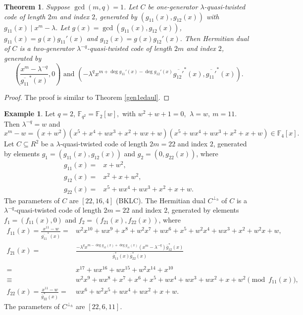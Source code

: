 \documentclass[12 pt]{extarticle}
\numberwithin{equation}{section}
\newtheorem{theorem}{Theorem}[section]
\theoremstyle{definition}
\newtheorem{example}{Example}[section]
\begin{document}
    \begin{theorem}\label{gen1hdaul}
Suppose $\gcd(m,q)=1$. Let $C$ be one-generator $\lambda$-quasi-twisted code of length $2m$ and index $2$, generated by $(g_{11}(x),g_{12}(x))$ with $g_{11}(x)\mid x^m-\lambda$. Let $g(x)=\gcd(g_{11}(x),g_{12}(x))$, $g_{11}(x)=g(x)g_{11}'(x)$ and $g_{12}(x)=g(x)g_{12}'(x)$. Then Hermitian dual of $C$ is a two-generator $\lambda^{-q}$-quasi-twisted code of length $2m$ and index $2$, generated by 
 $$\left (\frac{x^m-\lambda^{-q}}{\overline{g_{11}}^*(x)},0\right ) \text{ and } (-\lambda^q x^{m+\deg g_{11}'(x)-\deg g_{12}'(x)}\overline{g_{12}'}^*(x),\overline{g_{11}'}^*(x)).$$
\end{theorem}
\begin{proof}
    The proof is similar to Theorem \ref{gen1edaul}.
\end{proof}

\begin{example}
Let $q=2$, $\mathbb{F}_{q^2}=\mathbb{F}_2[w],$ with $w^2+w+1=0$, $\ \lambda=w,\  m=11$. Then $\lambda^{-q}=w$ and $$x^{m}-w=(x + w^2)(x^5 + x^4 + wx^3 + x^2 + wx + w)(x^5 + wx^4 + wx^3 + x^2 + x + w)\in \mathbb{F}_4[x].$$  
Let $C\subseteq R^2$ be a $\lambda$-quasi-twisted code of length $2m=22$ and index $2$, generated by elements $g_1=(g_{11}(x),g_{12}(x))$ and $g_2=(0,g_{22}(x))$, where
\begin{equation*}
    \begin{split}
       g_{11}(x)=&x+w^2,\\
       g_{12}(x)=&x^2+x+w^2, \\
       g_{22}(x)=&x^5 + wx^4 + wx^3 + x^2 + x + w. 
    \end{split}
\end{equation*}
The parameters of $C$ are $[22,16,4]$ (BKLC). The Hermitian dual $C^{\perp_h}$ of $C$ is a $\lambda^{-q}$-quasi-twisted code of length $2m=22$ and index $2$, generated by elements $f_1=(f_{11}(x),0)$ and $f_2=(f_{21}(x),f_{22}(x))$, where 
\begin{equation*}
\begin{split}
     f_{11}(x)=\frac{x^{11}-w}{\overline{g_{11}}^*(x)}=& w^2x^{10} + wx^9 + x^8 + w^2x^7 + wx^6 + x^5 + w^2x^4 + wx^3 + x^2 + w^2x +w,\\
      f_{21}(x)=&\frac{-\lambda^q x^{m-\deg g_{12}(x)+\deg g_{11}(x)}(x^m-\lambda^{-q})\overline{g}^*_{12}(x)}{\overline{g}^*_{11}(x)\overline{g}^*_{22}(x)}\\\\
      =&x^{17} + wx^{16} + wx^{15} + w^2x^{14} + x^{10}\\
\equiv& w^2x^9 + wx^8 + x^7 + x^6 + x^5 + wx^4 + wx^3 + wx^2 + x + w^2 \pmod{f_{11}(x)},\\
f_{22}(x)= \frac{x^{11}-w}{\overline{g}^*_{22}(x)}=&wx^6 + w^2x^5 + wx^4 + wx^2 + x + w.
\end{split}
\end{equation*}
 The parameters of $C^{\perp_h}$ are $[22,6,11]$.
\end{example}
\end{document}
